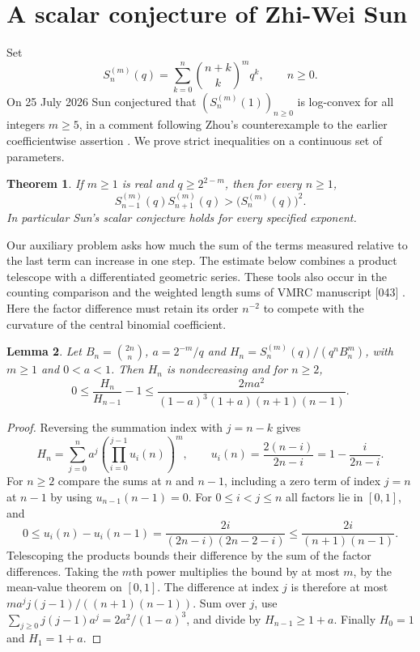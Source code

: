 \documentclass[11pt,a4paper]{article}
\newtheorem{theorem}{Theorem}[section]
\newtheorem{lemma}[theorem]{Lemma}
\theoremstyle{definition}\newtheorem{problem}[theorem]{Problem}
\begin{document}
\section{A scalar conjecture of Zhi-Wei Sun}
\label{sec:sunbin}

Set
\[
 S_n^{(m)}(q)=\sum_{k=0}^n\binom{n+k}{k}^{m}q^k,\qquad n\ge0.
\]
On 25 July 2026 Sun conjectured that $(S_n^{(m)}(1))_{n\ge0}$
is log-convex for all integers $m\ge5$, in a comment following Zhou's
counterexample to the earlier coefficientwise assertion \cite{zwsun}.
We prove strict inequalities on a continuous set of parameters.

\begin{theorem}\label{thm:sunbin}
If $m\ge1$ is real and $q\ge 2^{2-m}$, then for every $n\ge1$,
\[
 S_{n-1}^{(m)}(q) S_{n+1}^{(m)}(q)>\bigl(S_n^{(m)}(q)\bigr)^2 .
\]
In particular Sun's scalar conjecture holds for every specified exponent.
\end{theorem}

Our auxiliary problem asks how much the sum of the terms measured
relative to the last term can increase in one step. The estimate below
combines a product telescope with a differentiated geometric series.
These tools also occur in the counting comparison and the weighted
length sums of VMRC manuscript [043] \cite{vmrc}. Here the factor
difference must retain its order $n^{-2}$ to compete with the curvature
of the central binomial coefficient.

\begin{lemma}\label{lem:sunbin-drift}
Let $B_n=\binom{2n}{n}$, $a=2^{-m}/q$ and
$H_n=S_n^{(m)}(q)/(q^n B_n^m)$, with $m\ge1$ and $0<a<1$.
Then $H_n$ is nondecreasing and for $n\ge2$,
\[
 0\le\frac{H_n}{H_{n-1}}-1
 \le \frac{2ma^2}{(1-a)^3(1+a)(n+1)(n-1)}.
\]
\end{lemma}
\begin{proof}
Reversing the summation index with $j=n-k$ gives
\[
 H_n=\sum_{j=0}^n a^j
     \left(\prod_{i=0}^{j-1}u_i(n)\right)^m,\qquad
 u_i(n)=\frac{2(n-i)}{2n-i}=1-\frac{i}{2n-i}.
\]
For $n\ge2$ compare the sums at $n$ and $n-1$, including a zero term
of index $j=n$ at $n-1$ by using $u_{n-1}(n-1)=0$. For $0\le i<j\le n$
all factors lie in $[0,1]$, and
\[
 0\le u_i(n)-u_i(n-1)
 =\frac{2i}{(2n-i)(2n-2-i)}
 \le\frac{2i}{(n+1)(n-1)}.
\]
Telescoping the products bounds their difference by the sum of the
factor differences. Taking the $m$th power multiplies the bound by
at most $m$, by the mean-value theorem on $[0,1]$. The difference at
index $j$ is therefore at most $ma^j j(j-1)/((n+1)(n-1))$.
Sum over $j$, use $\sum_{j\ge0}j(j-1)a^j=2a^2/(1-a)^3$, and divide
by $H_{n-1}\ge1+a$. Finally $H_0=1$ and $H_1=1+a$.
\end{proof}
\end{document}
